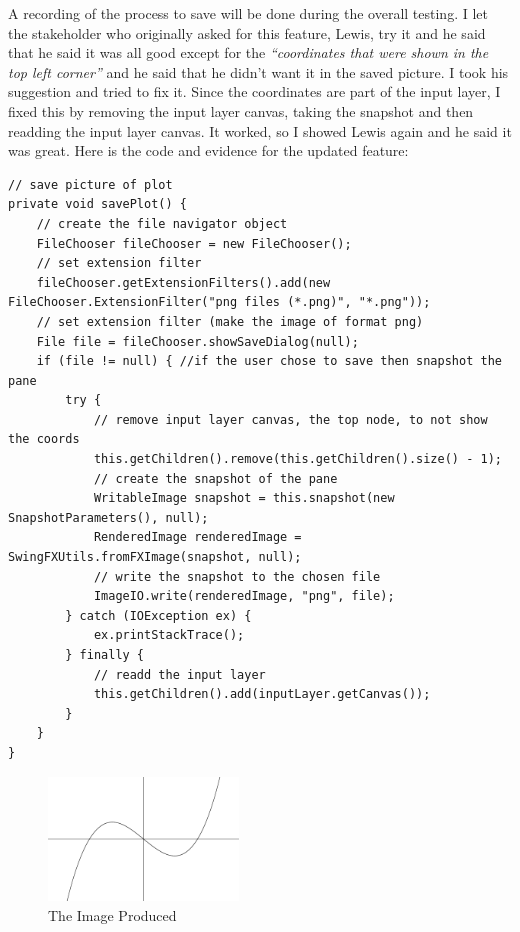\documentclass[../../../../main.tex]{subfiles}
\begin{document}
A recording of the process to save will be done during the overall testing.
\newpage
I let the stakeholder who originally asked for this feature, Lewis, try it and he said that he said it was all good except for the \textit{``coordinates that were shown in the top left corner''} and he said that he didn't want it in the saved picture. I took his suggestion and tried to fix it. Since the coordinates are part of the input layer, I fixed this by removing the input layer canvas, taking the snapshot and then readding the input layer canvas. It worked, so I showed Lewis again and he said it was great. Here is the code and evidence for the updated feature:
\begin{verbatim}
// save picture of plot
private void savePlot() {
	// create the file navigator object
	FileChooser fileChooser = new FileChooser();
	// set extension filter
	fileChooser.getExtensionFilters().add(new FileChooser.ExtensionFilter("png files (*.png)", "*.png"));
	// set extension filter (make the image of format png)
	File file = fileChooser.showSaveDialog(null);
	if (file != null) {	//if the user chose to save then snapshot the pane
		try {
			// remove input layer canvas, the top node, to not show the coords
			this.getChildren().remove(this.getChildren().size() - 1);
			// create the snapshot of the pane
			WritableImage snapshot = this.snapshot(new SnapshotParameters(), null);
			RenderedImage renderedImage = SwingFXUtils.fromFXImage(snapshot, null);
			// write the snapshot to the chosen file
			ImageIO.write(renderedImage, "png", file);
		} catch (IOException ex) {
			ex.printStackTrace();
		} finally {
			// readd the input layer
			this.getChildren().add(inputLayer.getCanvas());
		}
	}
}
\end{verbatim}
\begin{figure}[H]
	\centering
	\includegraphics[width=0.45\textwidth]{images/withoutCoords}
	\caption{The Image Produced}
\end{figure}
\end{document}
